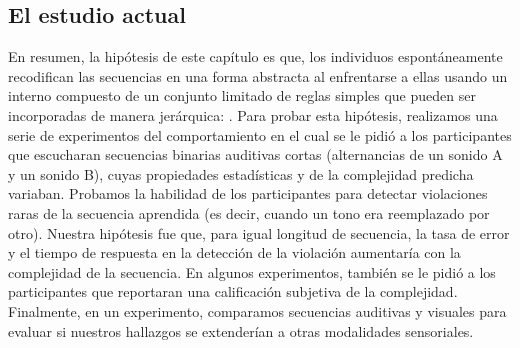 
\subsection{El estudio actual}


En resumen, la hipótesis de este capítulo es que, los individuos espontáneamente recodifican las secuencias en una forma abstracta al enfrentarse a ellas usando un \lot interno compuesto de un conjunto limitado de reglas simples que pueden ser incorporadas de manera jerárquica: \grambin. Para probar esta hipótesis, realizamos una serie de experimentos del comportamiento en el cual se le pidió a los participantes que escucharan secuencias binarias auditivas cortas (alternancias de un sonido A y un sonido B), cuyas propiedades estadísticas y de la complejidad predicha variaban. Probamos la habilidad de los participantes para detectar violaciones raras de la secuencia aprendida (es decir, cuando un tono era reemplazado por otro). Nuestra hipótesis fue que, para igual longitud de secuencia, la tasa de error y el tiempo de respuesta en la detección de la violación aumentaría con la complejidad de la secuencia. En algunos experimentos, también se le pidió a los participantes que reportaran una calificación subjetiva de la complejidad. Finalmente, en un experimento, comparamos secuencias auditivas y visuales para evaluar si nuestros hallazgos se extenderían a otras modalidades sensoriales.

